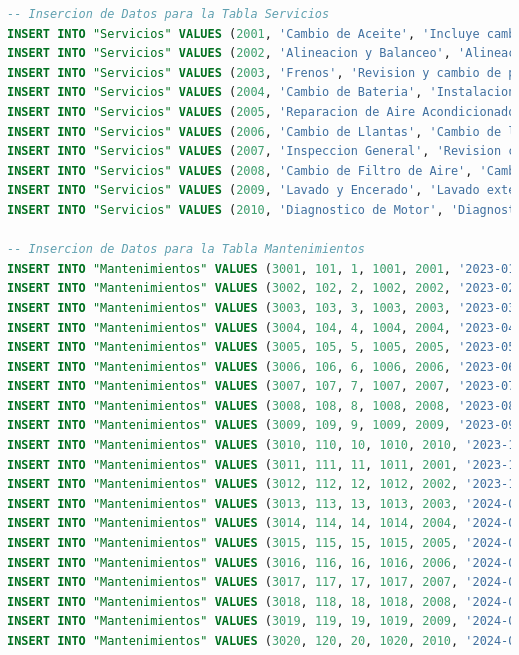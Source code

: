 \documentclass[12pt]{article}
\begin{document}
\begin{lstlisting}[language=SQL]
-- Insercion de Datos para la Tabla Servicios
INSERT INTO "Servicios" VALUES (2001, 'Cambio de Aceite', 'Incluye cambio de aceite y filtro.', 50.00);
INSERT INTO "Servicios" VALUES (2002, 'Alineacion y Balanceo', 'Alineacion y balanceo de las ruedas delanteras.', 80.00);
INSERT INTO "Servicios" VALUES (2003, 'Frenos', 'Revision y cambio de pastillas de freno.', 120.00);
INSERT INTO "Servicios" VALUES (2004, 'Cambio de Bateria', 'Instalacion de una nueva bateria.', 100.00);
INSERT INTO "Servicios" VALUES (2005, 'Reparacion de Aire Acondicionado', 'Reparacion y recarga de sistema de aire acondicionado.', 150.00);
INSERT INTO "Servicios" VALUES (2006, 'Cambio de Llantas', 'Cambio de llantas y balanceo.', 200.00);
INSERT INTO "Servicios" VALUES (2007, 'Inspeccion General', 'Revision completa del vehiculo.', 90.00);
INSERT INTO "Servicios" VALUES (2008, 'Cambio de Filtro de Aire', 'Cambio de filtro de aire del motor.', 30.00);
INSERT INTO "Servicios" VALUES (2009, 'Lavado y Encerado', 'Lavado exterior y encerado de la carroceria.', 40.00);
INSERT INTO "Servicios" VALUES (2010, 'Diagnostico de Motor', 'Diagnostico computarizado del sistema de motor.', 60.00);

-- Insercion de Datos para la Tabla Mantenimientos
INSERT INTO "Mantenimientos" VALUES (3001, 101, 1, 1001, 2001, '2023-01-15');
INSERT INTO "Mantenimientos" VALUES (3002, 102, 2, 1002, 2002, '2023-02-20');
INSERT INTO "Mantenimientos" VALUES (3003, 103, 3, 1003, 2003, '2023-03-25');
INSERT INTO "Mantenimientos" VALUES (3004, 104, 4, 1004, 2004, '2023-04-30');
INSERT INTO "Mantenimientos" VALUES (3005, 105, 5, 1005, 2005, '2023-05-05');
INSERT INTO "Mantenimientos" VALUES (3006, 106, 6, 1006, 2006, '2023-06-10');
INSERT INTO "Mantenimientos" VALUES (3007, 107, 7, 1007, 2007, '2023-07-15');
INSERT INTO "Mantenimientos" VALUES (3008, 108, 8, 1008, 2008, '2023-08-20');
INSERT INTO "Mantenimientos" VALUES (3009, 109, 9, 1009, 2009, '2023-09-25');
INSERT INTO "Mantenimientos" VALUES (3010, 110, 10, 1010, 2010, '2023-10-30');
INSERT INTO "Mantenimientos" VALUES (3011, 111, 11, 1011, 2001, '2023-11-05');
INSERT INTO "Mantenimientos" VALUES (3012, 112, 12, 1012, 2002, '2023-12-10');
INSERT INTO "Mantenimientos" VALUES (3013, 113, 13, 1013, 2003, '2024-01-15');
INSERT INTO "Mantenimientos" VALUES (3014, 114, 14, 1014, 2004, '2024-02-20');
INSERT INTO "Mantenimientos" VALUES (3015, 115, 15, 1015, 2005, '2024-03-25');
INSERT INTO "Mantenimientos" VALUES (3016, 116, 16, 1016, 2006, '2024-04-30');
INSERT INTO "Mantenimientos" VALUES (3017, 117, 17, 1017, 2007, '2024-05-05');
INSERT INTO "Mantenimientos" VALUES (3018, 118, 18, 1018, 2008, '2024-06-10');
INSERT INTO "Mantenimientos" VALUES (3019, 119, 19, 1019, 2009, '2024-07-15');
INSERT INTO "Mantenimientos" VALUES (3020, 120, 20, 1020, 2010, '2024-08-20');


\end{lstlisting}
\end{document}
